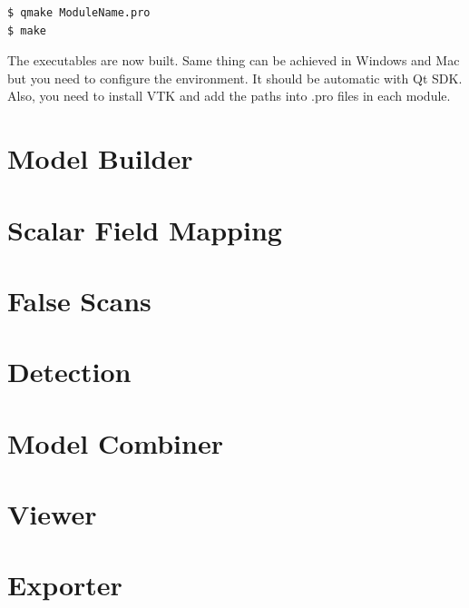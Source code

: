 \documentclass[11pt]{article} %
\begin{document}
\begin{verbatim}
$ qmake ModuleName.pro
$ make
\end{verbatim}

The executables are now built. Same thing can be achieved in Windows and Mac but you need to configure the environment. It should be automatic with Qt SDK. Also, you need to install VTK and add the paths into .pro  files in each module.

\section{Model Builder}

\section{Scalar Field Mapping}

\section{False Scans}

\section{Detection}

\section{Model Combiner}

\section{Viewer}

\section{Exporter}
\end{document}
